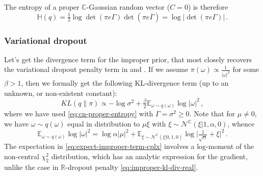 \documentclass[a4paper,10pt]{article}
\newcommand{\real}{\mathbb{R}}
\newcommand{\cplx}{\mathbb{C}}
\newcommand{\conj}[1]{\overline{#1}}
\begin{document}
The entropy of a proper $\cplx$-Gaussian random vector ($C = 0$) is therefore 
\begin{equation}  \label{eq:cn-proper-entropy}
  \mathbb{H}(q)
    = \tfrac12 \log \det{(\pi e \Gamma)} \det{(\pi e \conj{\Gamma})}
    = \log \bigl\lvert \det{(\pi e \Gamma)} \bigr\rvert
    \,.
\end{equation}

\subsubsection{Variational dropout} %
\label{ssub:variational_dropout}

Let's get the divergence term for the improper prior, that most closely recovers the variational
dropout penalty term in \cite{kingma_variational_2015} and \cite{molchanov_variational_2017}.
If we assume $
  \pi(\omega) \propto \tfrac1{\lvert \omega \rvert^\beta}
$ for some $\beta > 1$, then we formally get the following KL-divergence term (up to an unknown,
or non-existent constant):
\begin{equation}  \label{eq:var-do-kl-div-raw}
KL(q\| \pi)
  \propto
    - \log{\sigma^2}
    + \tfrac{\beta}2 \mathbb{E}_{\omega \sim q(\omega)} \log \lvert \omega \rvert^2
  \,,
\end{equation}
where we have used \eqref{eq:cn-proper-entropy} with $\Gamma = \sigma^2 \geq 0$. Note
that for $\mu \neq 0$, we have $\omega \sim q(\omega)$ equal in distribution to $\mu \xi$
with $\xi \sim \mathcal{N}^{\cplx}(\xi \vert 1, \alpha, 0)$, whence
\begin{equation}  \label{eq:expect-improper-term-cplx}
\mathbb{E}_{\omega \sim q(\omega)} \log \lvert \omega \rvert^2
  = \log \alpha \lvert \mu \rvert^2
    + \mathbb{E}_{\xi \sim \mathcal{N}^{\cplx}(\xi \vert 0, 1, 0)}
        \log{\bigl\lvert \tfrac1{\sqrt{\alpha}} + \xi \bigr\rvert^2}
  \,.
\end{equation}
The expectation in \eqref{eq:expect-improper-term-cplx} involves a log-moment of the non-central
$\chi^2_2$ distribution, which has an analytic expression for the gradient, unlike the case
in $\real$-dropout penalty \eqref{eq:improper-kl-div-real}.
\end{document}
